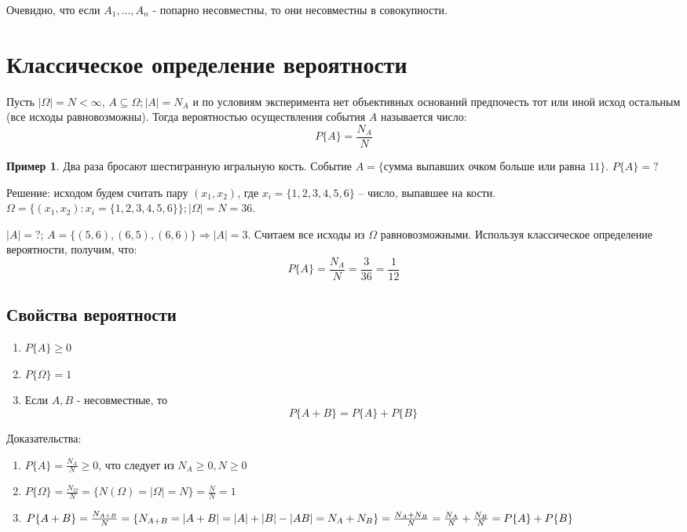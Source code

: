\documentclass[a4paper, 14pt]{report}
\theoremstyle{definition}
\newtheorem*{example}{Пример}
\begin{document}
		Очевидно, что если $A_1,...,A_n$ - попарно несовместны, то они несовместны в совокупности.
		
	\section{Классическое определение вероятности}
		Пусть $|\Omega|=N<\infty$, $A\subseteq\Omega; |A|=N_A$ и по условиям эксперимента нет объективных оснований предпочесть тот или иной исход остальным (все исходы равновозможны). Тогда вероятностью осуществления события $A$ называется число:
		\begin{equation}
			P\{A\}=\frac{N_A}{N}
		\end{equation}
	
		\begin{example}
			Два раза бросают шестигранную игральную кость. Событие $A=\{\text{сумма выпавших очком больше или равна 11}\}$. $P\{A\}=?$
			
			Решение: исходом будем считать пару $(x_1,x_2)$, где $x_i=\{1,2,3,4,5,6\}$ -- число, выпавшее на кости. $\Omega=\{(x_1,x_2): x_i=\{1,2,3,4,5,6\}\}; |\Omega|=N=36$.
			
			$|A|=?$; $A=\{(5, 6), (6, 5), (6, 6)\}\Rightarrow|A|=3$. Считаем все исходы из $\Omega$ равновозможными. Используя классическое определение вероятности, получим, что:
			\begin{equation}
				P\{A\}=\frac{N_A}{N}=\frac{3}{36}=\frac{1}{12}
			\end{equation}
		\end{example}
	
		\subsection{Свойства вероятности}
			\begin{enumerate}
				\item $P\{A\}\ge0$
				\item $P\{\Omega\}=1$
				\item Если $A, B$ - несовместные, то
				\begin{equation}
					P\{A+B\}=P\{A\}+P\{B\}
				\end{equation}
			\end{enumerate}
		
			Доказательства:
			\begin{enumerate}
				\item $P\{A\}=\frac{N_A}{N}\ge0$, что следует из $N_A\ge0, N\ge0$
				\item $P\{\Omega\}=\frac{N_\Omega}{N}=\{N(\Omega)=|\Omega|=N\}=\frac{N}{N}=1$
				\item $P\{A+B\}=\frac{N_{A+B}}{N} \\
				=\{N_{A+B}=|A+B|=|A|+|B|-|AB|=N_A+N_B\} \\
				=\frac{N_A+N_B}{N}=\frac{N_A}{N}+\frac{N_B}{N}=P\{A\}+P\{B\}$
			\end{enumerate}
\end{document}
